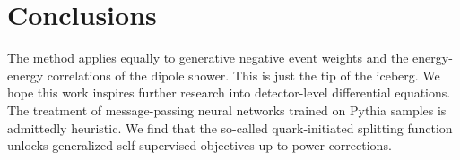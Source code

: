 \section{Conclusions}\label{sec:conclusions}

The method applies equally to generative negative event weights and the
energy-energy correlations of the dipole shower. This is just the tip of
the iceberg. We hope this work inspires further research into
detector-level differential equations. The treatment of message-passing
neural networks trained on Pythia samples is admittedly heuristic. We
find that the so-called quark-initiated splitting function unlocks
generalized self-supervised objectives up to power corrections.

